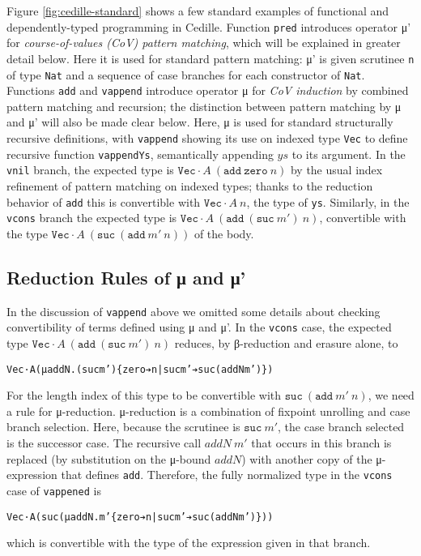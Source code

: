 \documentclass{article}
\begin{document}
Figure \ref{fig:cedille-standard} shows a few standard examples of functional
and dependently-typed programming in Cedille. Function \texttt{pred} introduces
operator μ' for \textit{course-of-values (CoV) pattern matching}, which will be
explained in greater detail below. Here it is used for standard pattern
matching: μ' is given scrutinee \texttt{n} of type \texttt{Nat} and a sequence
of case branches for each constructor of \texttt{Nat}. Functions \texttt{add}
and \texttt{vappend} introduce operator μ for \textit{CoV induction} by combined
pattern matching and recursion; the distinction between pattern matching by μ
and μ' will also be made clear below. Here, μ is used for standard structurally
recursive definitions, with \texttt{vappend} showing its use on indexed type
\texttt{Vec} to define recursive function \texttt{vappendYs}, semantically
appending $ys$ to its argument. In the \texttt{vnil} branch, the expected type
is \(\texttt{Vec} ·A\ (\texttt{add}\ \texttt{zero}\ n)\) by the usual index
refinement of pattern matching on indexed types; thanks to the reduction
behavior of \texttt{add} this is convertible with \(\texttt{Vec} ·A\ n\), the
type of \texttt{ys}. Similarly, in the \texttt{vcons} branch the expected type
is \(\texttt{Vec} ·A\ (\texttt{add}\ (\texttt{suc}\ m')\ n)\), convertible with
the type \(\texttt{Vec} ·A\ (\texttt{suc}\ (\texttt{add}\ m'\ n))\) of the body.

\subsection{Reduction Rules of μ and μ'}
In the discussion of \texttt{vappend} above we omitted some details about
checking convertibility of terms defined using μ and μ'. In the \texttt{vcons}
case, the expected type \(\texttt{Vec} ·A\ (\texttt{add}\ (\texttt{suc}\ m')\
n)\) reduces, by β-reduction and erasure alone, to
\begin{alltt}
Vec ·A (μ addN. (suc m') \{zero ➔ n | suc m' ➔ suc (addN m')\})
\end{alltt}

For the length index of this type to be convertible with \(\texttt{suc}\
(\texttt{add}\ m'\ n)\), we need a rule for μ-reduction. μ-reduction is a
combination of fixpoint unrolling and case branch selection. Here, because the
scrutinee is \(\texttt{suc}\ m'\), the case branch selected is the successor
case. The recursive call \(addN\ m'\) that occurs in this branch is replaced (by
substitution on the μ-bound \(addN\)) with another copy of the μ-expression that
defines \texttt{add}. Therefore, the fully normalized type in the \texttt{vcons}
case of \texttt{vappened} is
\begin{alltt}
Vec ·A (suc (μ addN. m' \{zero ➔ n | suc m' ➔ suc (addN m')\}))
\end{alltt}
\noindent which is convertible with the type of the expression given in that branch.
\end{document}
